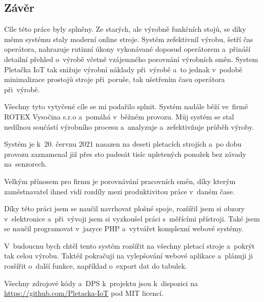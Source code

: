\documentclass[12pt, a4paper]{article}
\begin{document}
\subsection*{Závěr}



Cíle této práce byly splněny. Ze starých, ale výrobně funkčních stojů, se díky mému systému staly moderní online stroje.
Systém zefektivnil výrobu, šetří čas operátora, nahrazuje rutinní úkony vykonávané doposud operátorem a~přináší detailní přehled o~výrobě včetně vzájemného porovnání výrobních směn.
System Pletačka IoT tak snižuje výrobní náklady při~výrobě a~to jednak v~podobě minimalizace prostojů stroje při~poruše, tak ušetřením času operátora při~výrobě.

Všechny tyto vytyčené cíle se mi podařilo splnit. 
Systém nadále běží ve~firmě ROTEX Vysočina s.r.o a~pomáhá v~běžném provozu.
Můj systém se stal nedílnou součástí výrobního procesu a analyzuje a~zefektivňuje průběh výroby.

Systém je k 20. červnu 2021 nasazen na deseti pletacích strojích a po dobu provozu zaznamenal již přes sto padesát tisíc upletených ponožek bez závady na~senzorech.

Velkým přínosem pro firmu je porovnávání pracovních směn, díky kterým zaměstnavatel ihned vidí rozdíly mezi produktivitou práce v~daném čase.

Díky této práci jsem se naučil navrhovat plošné spoje, rozšířil jsem si obzory v~elektronice a~při~vývoji jsem si vyzkoušel práci s~měřícími přístroji. 
Také jsem se naučil programovat v~jazyce PHP a~vytvářet komplexní webové systémy.

V~budoucnu bych chtěl tento systém rozšířit na všechny pletací stroje a~pokrýt tak celou výrobu.
Taktéž pokračuji na vylepšování webové aplikace a~plánuji ji rozšířit o~další funkce, například o~export dat do tabulek.

Všechny zdrojové kódy a~DPS k~projektu jsou k~dispozici na \url{https://github.com/Pletacka-IoT} pod MIT licencí.

\newpage





\appendix



\end{document}
